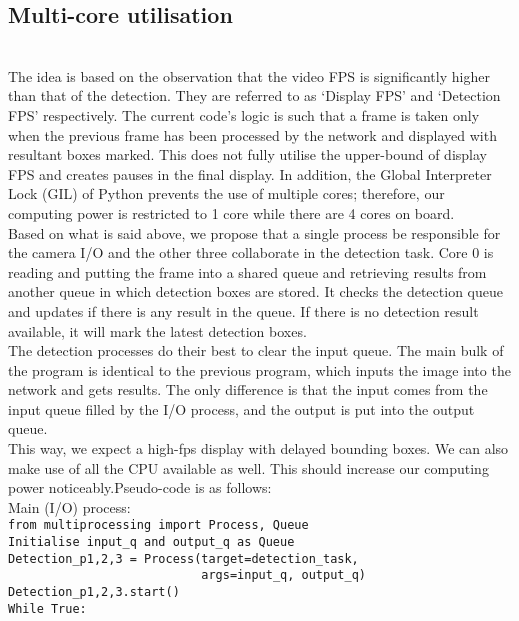 \subsection{Multi-core utilisation}\\[.2in]
The idea is based on the observation that the video FPS is significantly higher than that of the detection. They are referred to as ‘Display FPS’ and ‘Detection FPS’ respectively. The current code’s logic is such that a frame is taken only when the previous frame has been processed by the network and displayed with resultant boxes marked. This does not fully utilise the upper-bound of display FPS and creates pauses in the final display. In addition, the Global Interpreter Lock (GIL) of Python prevents the use of multiple cores; therefore, our computing power is restricted to 1 core while there are 4 cores on board.\\[.2in]
Based on what is said above, we propose that a single process be responsible for the camera I/O and the other three collaborate in the detection task. Core 0 is reading and putting the frame into a shared queue and retrieving results from another queue in which detection boxes are stored. It checks the detection queue and updates if there is any result in the queue. If there is no detection result available, it will mark the latest detection boxes. \\[.2in]
The detection processes do their best to clear the input queue. The main bulk of the program is identical to the previous program, which inputs the image into the network and gets results. The only difference is that the input comes from the input queue filled by the I/O process, and the output is put into the output queue. \\[.2in]
This way, we expect a high-fps display with delayed bounding boxes. We can also make use of all the CPU available as well. This should increase our computing power noticeably.Pseudo-code is as follows:\\[.2in]
Main (I/O) process:\\[.2in]
\verb#from multiprocessing import Process, Queue#\\
\verb#Initialise input_q and output_q as Queue#\\
\verb#Detection_p1,2,3 = Process(target=detection_task, #\\
\verb#                           args=input_q, output_q)#\\
\verb#Detection_p1,2,3.start()#\\[.2in]
\verb#While True:#\\
